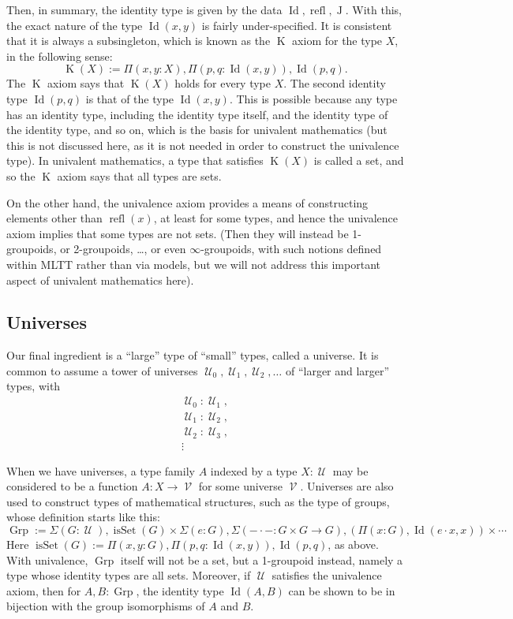 \documentclass{article}
\newcommand{\Id}{\operatorname{Id}}
\newcommand{\J}{\operatorname{J}}
\newcommand{\refl}{\operatorname{refl}}
\newcommand{\K}{\operatorname{K}}
\newcommand{\U}{\operatorname{\mathcal{U}}}
\newcommand{\V}{\operatorname{\mathcal{V}}}
\newcommand{\isSet}{\operatorname{isSet}}
\newcommand{\Grp}{\operatorname{Grp}}
\begin{document}
Then, in summary, the identity type is given by the data $\Id,\refl,\J$.
%
With this, the exact nature of the type $\Id(x,y)$ is fairly
under-specified. It is consistent that it is always a subsingleton,
which is known as the $\K$ axiom for the type $X$, in the following
sense:
\[
   \K(X) := \Pi(x,y:X), \Pi(p,q:\Id(x,y)), \Id(p,q).
\]
The $\K$ axiom says that $\K(X)$ holds for every type $X$.  The second
identity type $\Id(p,q)$ is that of the type $\Id(x,y)$. This is
possible because any type has an identity type, including the identity
type itself, and the identity type of the identity type, and so on,
which is the basis for univalent mathematics (but this is not
discussed here, as it is not needed in order to construct the
univalence type). In univalent mathematics, a type that satisfies
$\K(X)$ is called a set, and so the $\K$ axiom says that all types are
sets.

On the other hand, the univalence axiom provides a means of
constructing elements other than $\refl(x)$, at least for some types,
and hence the univalence axiom implies that some types are not
sets. (Then they will instead be 1-groupoids, or 2-groupoids, \dots, or
even $\infty$-groupoids, with such notions defined within MLTT rather
than via models, but we will not address this important aspect of
univalent mathematics here).

\subsection{Universes}

Our final ingredient is a ``large'' type of ``small'' types, called a
universe. It is common to assume a tower of universes $\U_0, \U_1, \U_2, \dots
$ of ``larger and larger'' types, with
\begin{gather*}
   \U_0 : \U_1, \\
   \U_1 : \U_2, \\
   \U_2 : \U_3, \\
\vdots
\end{gather*}

When we have universes, a type family $A$ indexed by a type $X:\U$ may be
considered to be a function $A:X\to \V$ for some universe $\V$.
%
Universes are also used to construct types of mathematical structures,
such as the type of groups, whose definition starts like this:
\[
 \Grp := \Sigma(G:\U), \isSet(G) \times  \Sigma(e:G), \Sigma(-\cdot- : G\times G\to G), (\Pi(x:G), \Id(e \cdot x,x)) \times  \cdots
\]
Here $\isSet(G):=\Pi(x,y:G),\Pi(p,q:\Id(x,y)),\Id(p,q)$, as above. With
univalence, $\Grp$ itself will not be a set, but a 1-groupoid instead,
namely a type whose identity types are all sets. Moreover, if $\U$
satisfies the univalence axiom, then for $A,B:\Grp$, the identity type
$\Id(A,B)$ can be shown to be in bijection with the group isomorphisms of
$A$ and $B$.
\end{document}

